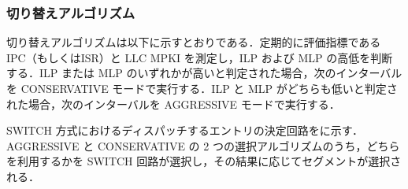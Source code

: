\subsubsection{切り替えアルゴリズム}
切り替えアルゴリズムは以下に示すとおりである．定期的に評価指標である IPC（もしくはISR）と LLC MPKI を測定し，ILP および MLP の高低を判断する．ILP または MLP のいずれかが高いと判定された場合，次のインターバルを CONSERVATIVE モードで実行する．ILP と MLP がどちらも低いと判定された場合，次のインターバルを AGGRESSIVE モードで実行する．

SWITCH 方式におけるディスパッチするエントリの決定回路をに示す．AGGRESSIVE と CONSERVATIVE の 2 つの選択アルゴリズムのうち，どちらを利用するかを SWITCH 回路が選択し，その結果に応じてセグメントが選択される．
